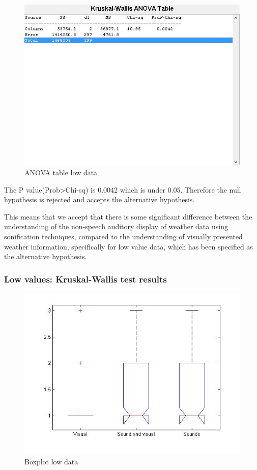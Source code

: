 \begin{figure}[!htbp]
    \centering
    \includegraphics[width=.7\textwidth]{images/Evaluation2.jpg}
    \caption{ANOVA table low data}
    \label{fig:evaluation2}
\end{figure}

The P value(Prob>Chi-sq) is 0.0042 which is under 0.05. 
Therefore the null hypothesis is rejected and accepts the alternative hypothesis.

This means that we accept that there is some significant difference between the understanding of the non-speech auditory display of weather data using sonification techniques, compared to the understanding of visually presented weather information, specifically for low value data, which has been specified as the alternative hypothesis.


\FloatBarrier
\subsubsection*{Low values: Kruskal-Wallis test results} %
\label{ssub:low_values_kruskal_wallis_test_results}

\begin{figure}[!htbp]
    \centering
    \includegraphics[width=.5\textwidth]{images/Evaluation3.jpg}
    \caption{Boxplot low data}
    \label{fig:evaluation3}
\end{figure}

